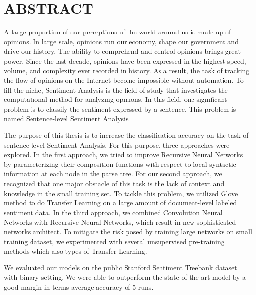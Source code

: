\chapter*{ABSTRACT}
\label{tomtat}

A large proportion of our perceptions of the world around us is made up of opinions.
In large scale, opinions run our economy, shape our government and drive our history.
The ability to comprehend and control opinions brings great power.
Since the last decade, opinions have been expressed in the highest speed, volume, and complexity ever recorded in history.
As a result, the task of tracking the flow of opinions on the Internet become impossible without automation.
To fill the niche, Sentiment Analysis is the field of study that investigates the computational method for analyzing opinions.
In this field, one significant problem is to classify the sentiment expressed by a sentence.
This problem is named Sentence-level Sentiment Analysis.

The purpose of this thesis is to increase the classification accuracy on the task of sentence-level Sentiment Analysis.
For this purpose, three approaches were explored.
In the first approach, we tried to improve Recursive Neural Networks by parameterizing their composition functions with respect to local syntactic information at each node in the parse tree.
For our second approach, we recognized that one major obstacle of this task is the lack of context and knowledge in the small training set.
To tackle this problem, we utilized Glove method to do Transfer Learning on a large amount of document-level labeled sentiment data.
In the third approach, we combined Convolution Neural Networks with Recursive Neural Networks, which result in new sophisticated networks architect.
To mitigate the risk posed by training large networks on small training dataset, we experimented with several unsupervised pre-training methods which also types of Transfer Learning.

We evaluated our models on the public Stanford Sentiment Treebank dataset with binary setting.
We were able to outperform the state-of-the-art model by a good margin in terms average accuracy of 5 runs.
